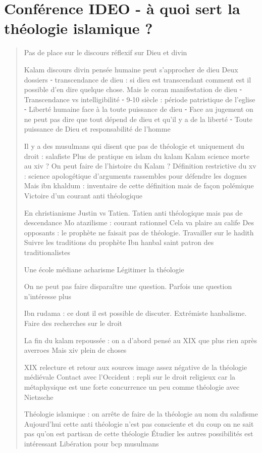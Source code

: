 \section{Conférence IDEO -  à quoi sert la théologie islamique ?}
\begin{quote}

Pas de place sur le discours réflexif sur Dieu et divin
 
Kalam discours divin pensée humaine peut s’approcher de dieu
Deux dossiers
	⁃	transcendance de dieu : si dieu est transcendant comment est il possible d’en dire quelque chose. Mais le coran manifestation de dieu
	⁃	Transcendance vs intelligibilité 
	⁃	9-10 siècle : période patristique de l'eglise
	⁃	Liberté humaine face à la toute puissance de dieu
	⁃	Face au jugement on ne peut pas dire que tout dépend de dieu et qu’il y a de la liberté 
	⁃	Toute puissance de Dieu et responsabilité de l’homme

Il y a des musulmans qui disent que pas de théologie et uniquement du droit : salafiste
Plus de pratique en islam du kalam
Kalam science morte au xiv ? On peut faire de l’histoire du Kalam ?
Définition restrictive du xv : science apologétique d’arguments rassembles pour défendre les dogmes
Mais ibn khaldum : inventaire de cette définition mais de façon polémique 
Victoire d’un courant anti théologique

En christianisme Justin vs Tatien. Tatien anti théologique mais pas de descendance
Mo atazilisme : courant rationnel
Cela va plaire au calife
Des opposants : le prophète ne faisait pas de théologie. Travailler sur le hadith 
Suivre les traditions du prophète
Ibn hanbal saint patron des traditionalistes

Une école médiane acharisme 
Légitimer la théologie

On ne peut pas faire disparaître une question. Parfois une question n’intéresse plus

Ibn rudama : ce dont il est possible de discuter. Extrémiste hanbalisme. Faire des recherches sur le droit

La fin du kalam repoussée : on a d’abord pensé au XIX que plus rien après averroes 
Mais xiv plein de choses

XIX relecture et retour aux sources image assez négative de la théologie médiévale
Contact avec l’Occident : repli sur le droit religieux car la métaphysique est une forte concurrence un peu comme théologie avec Nietzsche

Théologie islamique : on arrête de faire de la théologie au nom du salafisme
Aujourd’hui cette anti théologie n’est pas consciente et du coup on ne sait pas qu’on est partisan de cette théologie
Étudier les autres possibilités est intéressant
Libération pour bcp musulmans


\end{quote}
